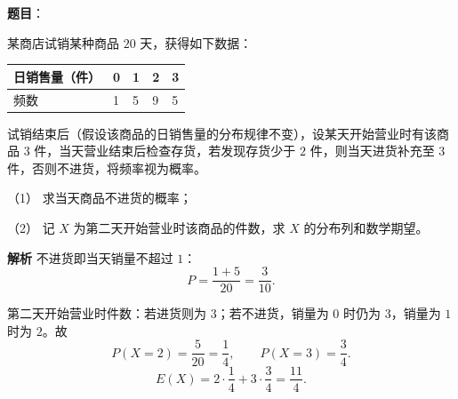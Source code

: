 \begin{answer}

\textbf{题目}：

某商店试销某种商品 $20$ 天，获得如下数据：

\begin{center}
\begin{tabular}{lllll}
\toprule
日销售量（件） & 0 & 1 & 2 & 3 \\
\midrule
频数 & 1 & 5 & 9 & 5 \\
\bottomrule
\end{tabular}
\end{center}

试销结束后（假设该商品的日销售量的分布规律不变），设某天开始营业时有该商品 $3$ 件，当天营业结束后检查存货，若发现存货少于 $2$ 件，则当天进货补充至 $3$ 件，否则不进货，将频率视为概率。

（1） 求当天商品不进货的概率；

（2） 记 $X$ 为第二天开始营业时该商品的件数，求 $X$ 的分布列和数学期望。

\textbf{解析}
不进货即当天销量不超过 $1$：
\nopagebreak[4]
\[P=\frac{1+5}{20}=\frac3{10}.\]

第二天开始营业时件数：若进货则为 $3$；若不进货，销量为 $0$ 时仍为 $3$，销量为 $1$ 时为 $2$。故
\nopagebreak[4]
\[P(X=2)=\frac5{20}=\frac14,\qquad P(X=3)=\frac34.\]
\nopagebreak[4]
\[E(X)=2\cdot\frac14+3\cdot\frac34=\frac{11}4.\]



\end{answer}

